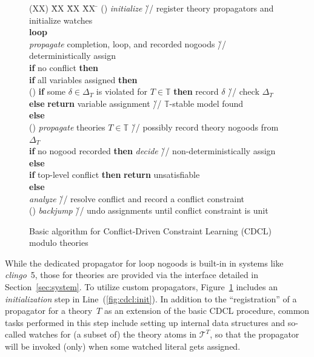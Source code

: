 \documentclass[a4paper,USenglish]{oasics-v2016}
\newcommand{\sysfont}{\textit}
\newcommand{\clingo}{\sysfont{clingo}}
\begin{document}
\begin{figure}[t]
  \setcounter{cddl}{8}
  \renewcommand{\thecddl}{\Alph{cddl}}
  \begin{tabbing}
   (XX)  \= XX \= XX \= XX \= \kill%
   (\thecddl)\label{fig:cdcl:init}
         \> \textit{initialize} \` // register theory propagators and initialize watches \\
         \> \textbf{loop} \\
         \> \> \textit{propagate} completion, loop, and recorded nogoods
               \` // deterministically assign \\
         \> \> \textbf{if} no conflict \textbf{then} \\
         \> \> \> \textbf{if} all variables assigned \textbf{then} \\
   \setcounter{cddl}{2}%
   (\thecddl)\label{fig:cdcl:check}
         \> \> \> \> \textbf{if} some $\delta\in\Delta_T$ is violated for   $T\in\mathbb{T}$ \textbf{then} record $\delta$
                     \` // check $\Delta_T$ \\
         \> \> \> \> \textbf{else} \textbf{return} variable assignment
                   \`// $\mathbb{T}$-stable model found \\
         \> \> \> \textbf{else} \\
   \setcounter{cddl}{15}%
   (\thecddl)\label{fig:cdcl:propagate}
         \> \> \> \> \textit{propagate} theories $T\in\mathbb{T}$
                     \`// possibly record theory nogoods from $\Delta_T$ \\
         \> \> \> \> \textbf{if} no nogood recorded \textbf{then} \textit{decide}
                     \`// non-deterministically assign \\
         \> \> \textbf{else} \\
         \> \> \> \textbf{if} top-level conflict \textbf{then} \textbf{return} unsatisfiable \\
         \> \> \> \textbf{else} \\
         \> \> \> \> \textit{analyze} \`// resolve conflict and record a conflict constraint \\
   \setcounter{cddl}{20}%
   (\thecddl)\label{fig:cdcl:undo}
         \> \> \> \> \textit{backjump} \`// undo assignments until conflict constraint is unit
 \end{tabbing}
\caption{Basic algorithm for Conflict-Driven %
         Constraint Learning (CDCL)
         modulo theories}
\label{fig:cdcl}
\end{figure}%
%
While the dedicated propagator for loop nogoods is built-in in systems like \clingo~5,
those for theories are provided via the interface detailed in Section~\ref{sec:system}.
To utilize custom propagators,
Figure~\ref{fig:cdcl} includes an \emph{initialization} step in Line~(\ref{fig:cdcl:init}).
In addition to the ``registration'' of a propagator for a theory~$T$
as an extension of the basic CDCL procedure,
common   tasks performed in this step include setting up internal data structures and
so-called watches for (a subset of) the theory atoms in $\mathcal{T}^T$,
so that the propagator will be invoked (only) when some watched literal gets assigned.
\end{document}
